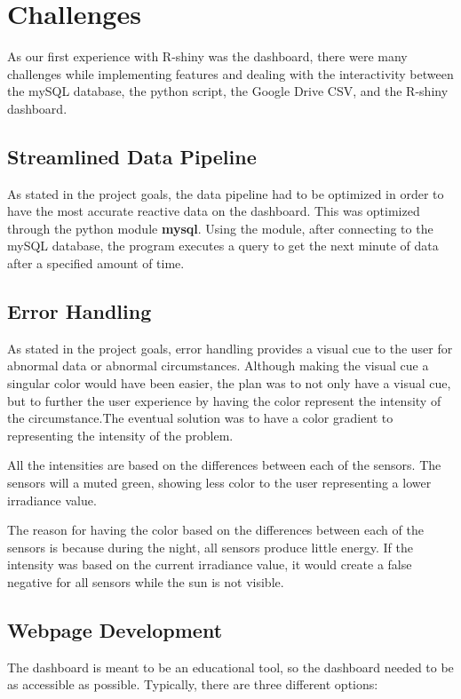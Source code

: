 \documentclass{sigchi}
\begin{document}
\section{Challenges}
As our first experience with R-shiny was the dashboard, there were many challenges while implementing features and dealing with the interactivity between the mySQL database, the python script, the Google Drive CSV, and the R-shiny dashboard. 

\subsection{Streamlined Data Pipeline}
As stated in the project goals, the data pipeline had to be optimized in order to have the most accurate reactive data on the dashboard. This was optimized through the python module \textbf{mysql}\cite{5_MySQL}. Using the module, after connecting to the mySQL database, the program executes a query to get the next minute of data after a specified amount of time.
\subsection{Error Handling}
As stated in the project goals, error handling provides a visual cue to the user for abnormal data or abnormal circumstances. Although making the visual cue a singular color would have been easier, the plan was to not only have a visual cue, but to further the user experience by having the color represent the intensity of the circumstance.The eventual solution was to have a color gradient to representing the intensity of the problem. 

All the intensities are based on the differences between each of the sensors. The sensors will a muted green, showing less color to the user representing a lower irradiance value.

The reason for having the color based on the differences between each of the sensors is because during the night, all sensors produce little energy. If the intensity was based on the current irradiance value, it would create a false negative for all sensors while the sun is not visible. 

\subsection{Webpage Development}
The dashboard is meant to be an educational tool, so the dashboard needed to be as accessible as possible. Typically, there are three different options:\\
\end{document}
